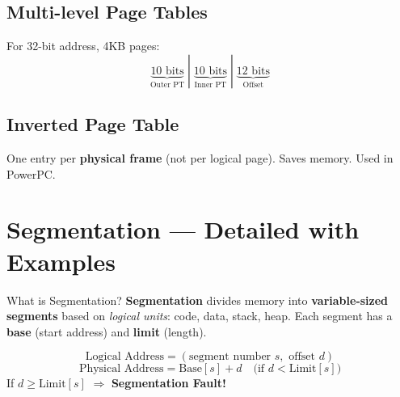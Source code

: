 \documentclass[12pt,a4paper]{article}
\begin{document}
\subsection{Multi-level Page Tables}
For 32-bit address, 4KB pages:
\[
\underbrace{10 \text{ bits}}_{\text{Outer PT}} \; | \; \underbrace{10 \text{ bits}}_{\text{Inner PT}} \; | \; \underbrace{12 \text{ bits}}_{\text{Offset}}
\]

\subsection{Inverted Page Table}
One entry per \textbf{physical frame} (not per logical page). Saves memory. Used in PowerPC.

\section{Segmentation --- Detailed with Examples}

\begin{conceptbox}{What is Segmentation?}
\textbf{Segmentation} divides memory into \textbf{variable-sized segments} based on \textit{logical units}: code, data, stack, heap. Each segment has a \textbf{base} (start address) and \textbf{limit} (length).

\[
\text{Logical Address} = (\text{segment number } s, \text{ offset } d)
\]
\[
\text{Physical Address} = \text{Base}[s] + d \quad \text{(if } d < \text{Limit}[s]\text{)}
\]
If $d \geq \text{Limit}[s]$ $\Rightarrow$ \textbf{Segmentation Fault!}
\end{conceptbox}
\end{document}
